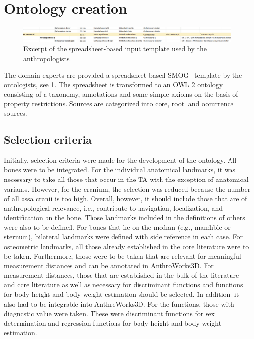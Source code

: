 \documentclass[sw]{iosart2x}
\newcommand{\aw}{AnthroWorks3D}
\begin{document}

\section{Ontology creation}

\begin{figure}[h]
\includegraphics[width=\textwidth]{img/smog.png}
\caption{Excerpt of the spreadsheet-based input template used by the anthropologists.}\label{fig:smog}
\end{figure}
The domain experts are provided a spreadsheet-based SMOG~\citep{smog} template by the ontologists, see \cref{fig:smog}.
The spreadsheet is transformed to an OWL 2 ontology consisting of a taxonomy, annotations and some simple axioms on the basis of property restrictions.
Sources are categorized into core, root, and occurrence sources.

\subsection{Selection criteria}
Initially, selection criteria were made for the development of the ontology.
All bones were to be integrated.
For the individual anatomical landmarks, it was necessary to take all those that occur in the TA with the exception of anatomical variants.
However, for the cranium, the selection was reduced because the number of all ossa cranii is too high.
Overall, however, it should include those that are of anthropological relevance, i.e., contribute to navigation, localization, and identification on the bone.
Those landmarks included in the definitions of others were also to be defined.
For bones that lie on the median (e.g., mandible or sternum), bilateral landmarks were defined with side reference in each case.
For osteometric landmarks, all those already established in the core literature were to be taken.
Furthermore, those were to be taken that are relevant for meaningful measurement distances and can be annotated in \aw{}.
For measurement distances, those that are established in the bulk of the literature and core literature as well as necessary for discriminant functions and functions for body height and body weight estimation should be selected.
In addition, it also had to be integrable into \aw{}.
For the functions, those with diagnostic value were taken.
These were discriminant functions for sex determination and regression functions for body height and body weight estimation.
\end{document}
